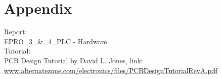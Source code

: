 \chapter{Appendix}
Report:\\
EPRO\_3\_\&\_4\_PLC - Hardware\\
Tutorial:\\
PCB Design Tutorial by David L. Jones, link:\\
\url{www.alternatezone.com/electronics/files/PCBDesignTutorialRevA.pdf}
